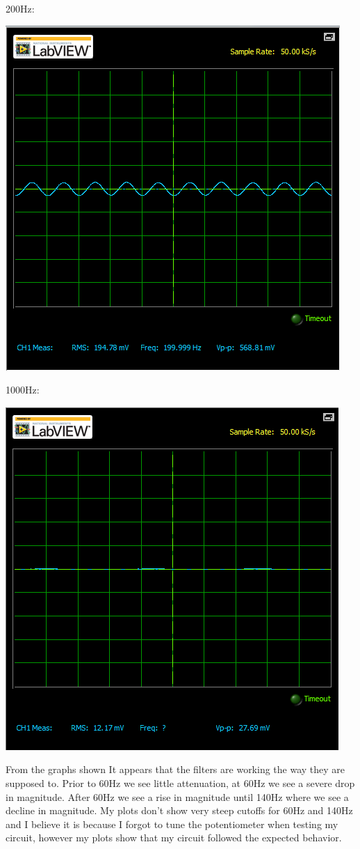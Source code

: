\documentclass[12pt,letterpaper,boxed]{hmcpset}
\begin{document}
200Hz:
\begin{center}
\includegraphics[scale=.8]{200Hz}
\end{center}
\newpage
1000Hz:
\begin{center}
\includegraphics[scale=.8]{1000Hz}
\end{center}

From the graphs shown It appears that the filters are working the way they are supposed to. Prior to 60Hz we see little attenuation, at 60Hz we see a severe drop in magnitude. After 60Hz we see a rise in magnitude until 140Hz where we see a decline in magnitude. My plots don't show very steep cutoffs for 60Hz and 140Hz and I believe it is because I forgot to tune the potentiometer when testing my circuit, however my plots show that my circuit followed the expected behavior.
\end{document}
